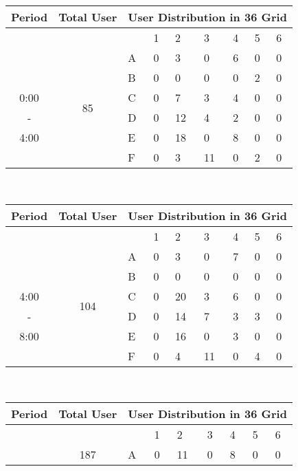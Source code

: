 \begin{table*}[hpt]	
\begin{minipage}{.5\linewidth}	
\centering	
\begin{tabular}{|c|c|p{0.4cm}|p{0.4cm}|p{0.4cm}|p{0.4cm}|p{0.4cm}|p{0.4cm}|p{0.4cm}|}	
\hline	
Period & Total User &\multicolumn{7}{c|}{User Distribution in 36 Grid} \\	
\hline	
&& & 1 &2 & 3 & 4 & 5&6\\	
\cline{3-9}	
 & \multirow{7}{*}{85}	
 &A	
& 0& 3& 0& 6& 0& 0  \\	
\cline{3-9}	
 && B	
& 0& 0& 0& 0& 2& 0  \\	
\cline{3-9}	
0:00 && C	
& 0& 7& 3& 4& 0& 0  \\	
\cline{3-9}	
 -&& D 	
& 0& 12& 4& 2& 0& 0  \\	
\cline{3-9}	
4:00 && E 	
& 0& 18& 0& 8& 0& 0  \\	
\cline{3-9}	
 && F 	
& 0& 3& 11& 0& 2& 0  \\	
\hline	
\end{tabular}	
\vspace*{0.1in} \\	
\begin{tabular}{|c|c|p{0.4cm}|p{0.4cm}|p{0.4cm}|p{0.4cm}|p{0.4cm}|p{0.4cm}|p{0.4cm}|}	
\hline	
Period & Total User &\multicolumn{7}{c|}{User Distribution in 36 Grid} \\	
\hline	
&& & 1 &2 & 3 & 4 & 5&6\\	
\cline{3-9}	
 & \multirow{7}{*}{104}	
 &A	
& 0& 3& 0& 7& 0& 0  \\	
\cline{3-9}	
 && B	
& 0& 0& 0& 0& 0& 0  \\	
\cline{3-9}	
4:00 && C	
& 0& 20& 3& 6& 0& 0  \\	
\cline{3-9}	
 -&& D 	
& 0& 14& 7& 3& 3& 0  \\	
\cline{3-9}	
8:00 && E 	
& 0& 16& 0& 3& 0& 0  \\	
\cline{3-9}	
 && F 	
& 0& 4& 11& 0& 4& 0  \\	
\hline	
\end{tabular}	
\vspace*{0.1in} \\	
\begin{tabular}{|c|c|p{0.4cm}|p{0.4cm}|p{0.4cm}|p{0.4cm}|p{0.4cm}|p{0.4cm}|p{0.4cm}|}	
\hline	
Period & Total User &\multicolumn{7}{c|}{User Distribution in 36 Grid} \\	
\hline	
&& & 1 &2 & 3 & 4 & 5&6\\	
\cline{3-9}	
 & \multirow{7}{*}{187}	
 &A	
& 0& 11& 0& 8& 0& 0  \\	

\end{tabular}
\end{minipage}
\end{table*}
